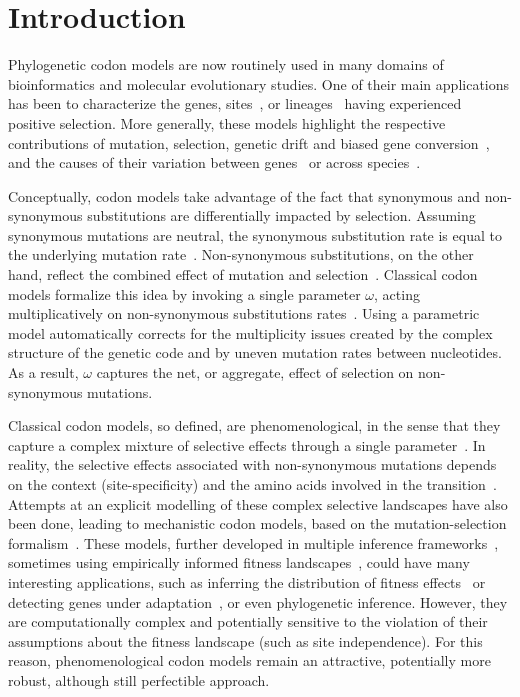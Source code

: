 \documentclass{article}
\begin{document}

\section{Introduction}

Phylogenetic codon models are now routinely used in many domains of bioinformatics and molecular evolutionary studies.
One of their main applications has been to characterize the genes, sites~\citep{Nielsen1998}, or lineages~\citep{Zhang2004} having experienced positive selection.
More generally, these models highlight the respective contributions of mutation, selection, {genetic drift} and biased gene conversion~\citep{Kosiol2019}, and the causes of their variation between genes~\citep{Zhang2015} or across species~\citep{Lartillot2011}.

Conceptually, codon models take advantage of the fact that {synonymous} and {non-synonymous} {substitutions} are differentially impacted by selection.
Assuming {synonymous} mutations are {neutral}, the {synonymous} {substitution} rate is equal to the underlying mutation rate~\citep{kimura1983neutral}.
Non-synonymous {substitutions}, on the other hand, reflect the combined effect of mutation and selection~\citep{Ohta1995}.
Classical codon models formalize this idea by invoking a single parameter $\omega$, acting multiplicatively on {non-synonymous} {substitutions} rates~\citep{Muse1994, Goldman1994}.
Using a parametric model automatically corrects for the multiplicity issues created by the complex structure of the genetic code and by uneven mutation rates between nucleotides.
As a result, $\omega$ captures the net, or aggregate, effect of selection on {non-synonymous} mutations.

Classical codon models, so defined, are phenomenological, in the sense that they capture a complex mixture of selective effects through a single parameter~\citep{Rodrigue2010a}.
In reality, the selective effects associated with {non-synonymous} mutations depends on the context (site-specificity) and the amino acids involved in the transition~\citep{Kosiol2007}.
Attempts at an explicit modelling of these complex selective landscapes have also been done, leading to mechanistic codon models, based on the mutation-selection formalism~\citep{Halpern1998}.
These models, further developed in multiple inference frameworks~\citep{Rodrigue2010, Tamuri2012}, sometimes using empirically informed fitness landscapes~\citep{Bloom2014}, could have many interesting applications, such as inferring the distribution of fitness effects~\citep{Tamuri2012} or detecting genes under adaptation~\citep{Rodrigue2016}, or even phylogenetic inference.
However, they are computationally complex and potentially sensitive to the violation of their assumptions about the fitness landscape (such as site independence).
For this reason, phenomenological codon models remain an attractive, potentially more robust, although still perfectible approach.
\end{document}

